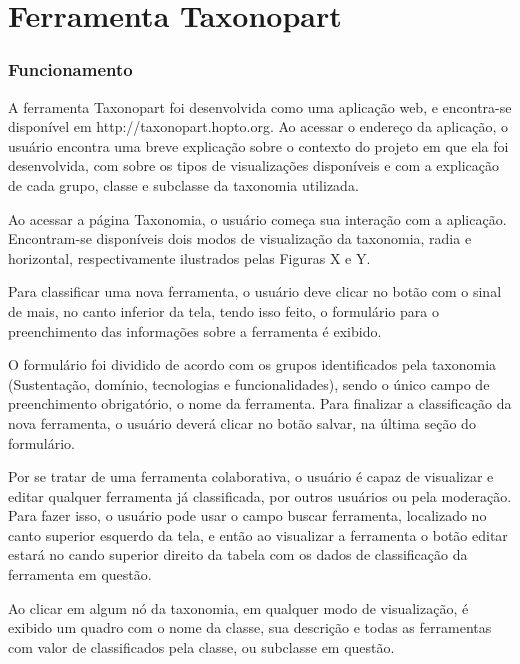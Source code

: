 \chapter[Ferramenta]{Ferramenta Taxonopart}
\label{cap:cap3}

\subsection{Funcionamento}
\label{sec:funcionamento}
A ferramenta Taxonopart foi desenvolvida como uma aplicação web, e encontra-se disponível em http://taxonopart.hopto.org.
Ao acessar o endereço da aplicação, o usuário encontra uma breve explicação sobre o contexto do projeto em que ela foi desenvolvida,
com sobre os tipos de visualizações disponíveis e com a explicação de cada grupo, classe e subclasse da taxonomia utilizada.

\par
Ao acessar a página Taxonomia, o usuário começa sua interação com a aplicação. Encontram-se disponíveis dois modos de visualização da taxonomia, radia e horizontal,
respectivamente ilustrados pelas Figuras X e Y.

Para classificar uma nova ferramenta, o usuário deve clicar no botão com o  sinal de mais, no canto inferior da tela, tendo isso feito,
o formulário para o preenchimento das informações sobre a ferramenta é exibido.

\par
O formulário foi dividido de acordo com os grupos identificados pela taxonomia (Sustentação, domínio, tecnologias e funcionalidades), sendo o único campo de preenchimento
obrigatório, o nome da ferramenta. Para finalizar a classificação da nova ferramenta, o usuário deverá clicar no botão salvar, na última seção do formulário. 

\par
Por se tratar de uma ferramenta colaborativa, o usuário é capaz de visualizar e editar qualquer ferramenta já classificada, por outros usuários ou pela moderação. 
Para fazer isso, o usuário pode usar o campo buscar ferramenta, localizado no canto superior esquerdo da tela, e então ao visualizar a ferramenta o botão editar estará 
no cando superior direito da tabela com os dados de classificação da ferramenta em questão.

\par
Ao clicar em algum nó da taxonomia, em qualquer modo de visualização, é exibido um quadro com o nome da classe, sua descrição e todas as ferramentas
com valor de classificados pela classe, ou subclasse em questão.

